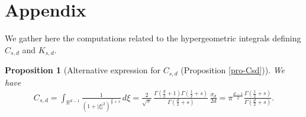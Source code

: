 \documentclass[11pt]{article}
\newtheorem{proposition}[definition]{Proposition}
\begin{document}

\section{Appendix}\label{Appendix}
We gather here the computations related to the hypergeometric integrals defining $C_{s,d}$ and $K_{s,d}$.

\begin{proposition}[Alternative expression for $C_{s,d}$ (Proposition \ref{pro-Csd})]\label{pro-Csd-1}
We have 
\begin{align*}%
C_{s,d}=\int_{\mathbb{R}^{d-1}}
\frac{1}{(1+|\xi|^2)^{\frac{d}{2}+s}}
\,d\xi=\frac{2}{\sqrt\pi} \,
\frac{\Gamma(\frac{d}{2}+1)\Gamma(\frac{1}{2}+s)}{\Gamma(\frac{d}{2}+s)}\, \frac{\sigma_d}{2d}=\pi^{\frac{d-1}{2}} \frac{\Gamma(\frac{1}{2}+s)}{\Gamma(\frac{d}{2}+s)}. 
\end{align*}
\end{proposition}
\end{document}
